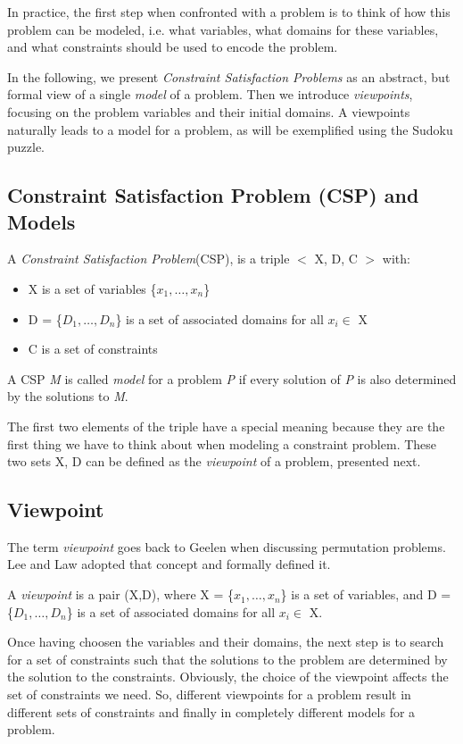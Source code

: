 \documentclass[a4paper,halfparskip]{scrartcl}
\begin{document}
In practice, the first step when confronted with a problem is to think
of how this problem can be modeled, i.e. what variables, what
domains for these variables, and what constraints
should be used to encode the problem.

In the following, we present \emph{Constraint Satisfaction Problems}
as an abstract, but formal view of a single \emph{model} of a problem.
Then we introduce \emph{viewpoints}, focusing on the problem variables
and their initial domains. A viewpoints naturally leads to a model for
a problem, as will be exemplified using the Sudoku puzzle.

\subsection{Constraint Satisfaction Problem (CSP) and Models}
A \emph{Constraint Satisfaction Problem}(CSP), is a triple
$<$ X, D, C $>$ with: 
\begin{itemize}
\item
X is a set of variables \{$x_1, \ldots, x_n$\}
\item
D = \{$ D_1, \ldots, D_n$\} is a set 
of associated domains for all $x_i \in$ X
\item
C is a set of constraints
\end{itemize}
A CSP \emph{M} is called \emph{model} for a problem \emph{P}
if every solution of \emph{P} is also determined by
the solutions to \emph{M}.

The first two elements of the triple have a special
meaning because they are the first thing we have to think
about when modeling a constraint problem. These two 
sets X, D can be defined as the \emph{viewpoint} of a
problem, presented next.
  
\subsection{Viewpoint}
\label{viewp}
The term \emph{viewpoint} goes back to Geelen \cite{6} when
discussing permutation problems. Lee and Law \cite{7} adopted
that concept and formally defined it.

A \emph{viewpoint} is a pair (X,D), where X = \{$x_1, \ldots, x_n$\} 
is a set of variables, and D = \{$ D_1, \ldots, D_n$\} is a set 
of associated domains for all $x_i \in$ X.

Once having choosen the variables and their domains, the next
step is to search for a set of constraints such that the solutions 
to the problem are determined by the solution to the constraints.
Obviously, the choice of the viewpoint affects the set of
constraints we need. So, different viewpoints for a problem
result in different sets of constraints and finally in completely
different models for a problem.
 
\end{document}
